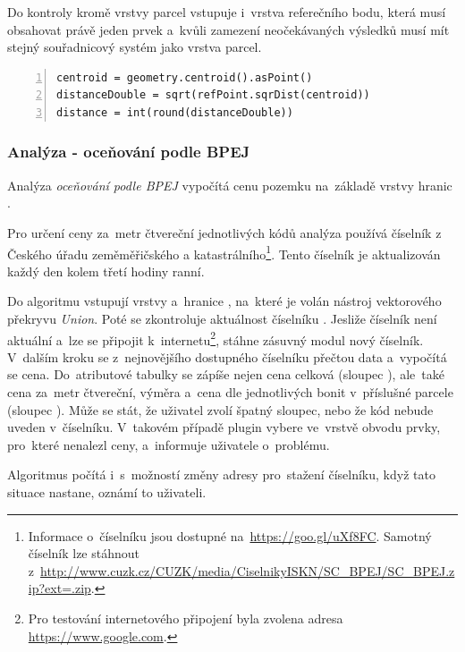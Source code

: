 Do kontroly kromě vrstvy parcel vstupuje i~vrstva referečního bodu, která musí obsahovat právě jeden prvek a~kvůli zamezení neočekávaných výsledků musí mít stejný souřadnicový systém jako vrstva parcel.

{\scriptsize
\begin{lstlisting}[style=python, caption={Analýza \textit{měření vzdálenosti} - výpočet vzdálenosti težiště od~refenčního bodu}, captionpos=b, label=analyza_vzdalenost_vypocet_vzdalenosti_teziste_od_ref_bodu, backgroundcolor = \color{light-gray},  numbers=left]
centroid = geometry.centroid().asPoint()
distanceDouble = sqrt(refPoint.sqrDist(centroid))
distance = int(round(distanceDouble))
\end{lstlisting}}

\subsubsection{Analýza - oceňování podle BPEJ}
\label{analyza_bpej}

Analýza \textit{oceňování podle BPEJ} vypočítá cenu pozemku na~základě vrstvy hranic .

Pro určení ceny za~metr čtvereční jednotlivých kódů  analýza používá číselník  z Českého úřadu zeměměřičského a katastrálního\footnote{Informace o~číselníku jsou dostupné na~\url{https://goo.gl/uXf8FC}. Samotný číselník lze stáhnout z~\url{http://www.cuzk.cz/CUZK/media/CiselnikyISKN/SC_BPEJ/SC_BPEJ.zip?ext=.zip}.}. Tento číselník je aktualizován každý den kolem třetí hodiny ranní.

Do algoritmu vstupují vrstvy \texttt{} a~hranice , na~které je volán nástroj vektorového překryvu \textit{Union}. Poté se zkontroluje aktuálnost číselníku . Jesliže číselník není aktuální a~lze se připojit k~internetu\footnote{Pro testování internetového připojení byla zvolena adresa \url{https://www.google.com}.}, stáhne zásuvný modul nový číselník. V~dalším kroku se z~nejnovějšího dostupného číselníku přečtou data a~vypočítá se cena. Do~atributové tabulky se zápíše nejen cena celková (sloupec \texttt{}), ale~také cena za~metr čtvereční, výměra a~cena dle jednotlivých bonit v~příslušné parcele (sloupec \texttt{}). Může se stát, že uživatel zvolí špatný sloupec, nebo že kód  nebude uveden v~číselníku. V~takovém případě plugin vybere ve~vrstvě obvodu prvky, pro~které nenalezl ceny, a~informuje uživatele o~problému.

Algoritmus počítá i~s~možností změny adresy pro~stažení číselníku, když tato situace nastane, oznámí to uživateli.

